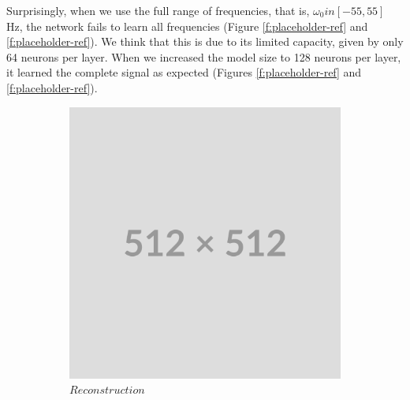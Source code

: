 Surprisingly, when we use the full range of frequencies, that is, $\omega_0 in [-55, 55]$ Hz, the network fails to learn all frequencies (Figure \ref{f:placeholder-ref} and \ref{f:placeholder-ref}). We think that this is due to its limited capacity, given by only 64 neurons per layer. When we increased the model size to 128 neurons per layer, it learned the complete signal as expected (Figures \ref{f:placeholder-ref} and \ref{f:placeholder-ref}).

\begin{figure}
    \centering
    \begin{subfigure}[b]{0.4\textwidth}
        \centering
        \includegraphics[width=\textwidth]{img/placeholder512.png}
        \caption{$Reconstruction$}
        \label{fig:rec-64-full-45}
    \end{subfigure}
    \hfill
    \begin{subfigure}[b]{0.4\textwidth}
        \centering

\end{subfigure}
\end{figure}
